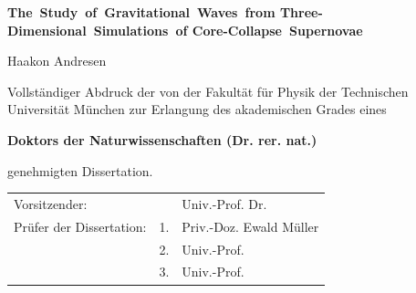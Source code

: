 \documentclass[a4paper,12pt,twoside]{scrbook}
\newcommand{\thesistitle}{\mbox{The Study of Gravitational Waves from} \mbox{Three-Dimensional Simulations of} \mbox{Core-Collapse Supernovae}}
\newcommand{\titlenamefont}[1]{\Large{#1}}
\newcommand{\titledoktorfont}[1]{\textbf{\Large{#1}}}
\newcommand{\titletitlefont}[1]{\huge{\textbf{#1}}}
\begin{document}
\thispagestyle{empty}
\begin{center}
\bgroup
\tabcolsep=10mm
  \egroup

  \vspace*{1.8cm}

  \noindent

  \titletitlefont{\thesistitle}

  \vspace*{0.7cm}

  \noindent
  \titlenamefont{Haakon Andresen}

  \end{center}

  \vspace*{1cm}

  \noindent
  Vollst\"andiger Abdruck der von der Fakult\"at f\"ur Physik der Technischen
  Universit\"at M\"unchen zur Erlangung des akademischen Grades eines

  \begin{center}
  \titledoktorfont{Doktors der Naturwissenschaften (Dr. rer. nat.)}
  \end{center}

  \noindent
  genehmigten Dissertation.

  \vspace*{1cm}

  \begin{tabular}{lll}
  Vorsitzender: & & Univ.-Prof. Dr. \\
  Pr\"ufer der Dissertation: & 1. & Priv.-Doz. Ewald M\"uller  \\
			     & 2. & Univ.-Prof.  \\
                             & 3. & Univ.-Prof. 
  \end{tabular}
\end{document}
